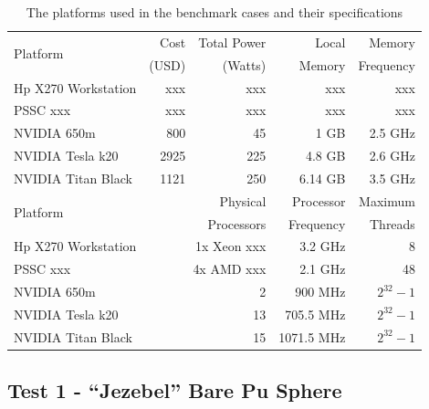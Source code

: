\documentclass[preprint,12pt]{elsarticle}
\begin{document}
\begin{table}[h]
\centering
\caption{The platforms used in the benchmark cases and their specifications}
\label{platform_table}
\small
\begin{tabular}{| l | r | r | r | r |}
\hline
\multirow{2}{*}{Platform} &  Cost   &Total Power  & Local       & Memory     \\
                                       & (USD)  &(Watts) & Memory  & Frequency \\
\hline
Hp X270 Workstation     &    xxx    & xxx &  xxx         &  xxx                      \\
\hline
PSSC xxx                      &    xxx   & xxx &  xxx        &  xxx                    \\
\hline
NVIDIA 650m                &    800   & 45 &  1 GB        &  2.5 GHz                 \\
\hline
NVIDIA Tesla k20         &    2925     & 225 &  4.8  GB      &  2.6 GHz                  \\
\hline
NVIDIA Titan Black       &     1121   & 250 &  6.14 GB        & 3.5 GHz              \\
\hline
\hline
\hline
\multirow{2}{*}{Platform}  &  \multicolumn{2}{r|}{Physical }     & Processor  & Maximum \\
                                        & \multicolumn{2}{r|}{Processors}  & Frequency  & Threads \\
\hline
Hp X270 Workstation      &  \multicolumn{2}{r|}{1x Xeon xxx}  &  3.2 GHz     &  8           \\
\hline
PSSC xxx                      &   \multicolumn{2}{r|}{4x AMD xxx }  &  2.1 GHz     &  48           \\
\hline
NVIDIA 650m                &     \multicolumn{2}{r|}{2}   &   900 MHz    &  $2^{32}-1$           \\
\hline
NVIDIA Tesla k20         &       \multicolumn{2}{r|}{13}   &  705.5 MHz     &  $2^{32}-1$           \\
\hline
NVIDIA Titan Black       &      \multicolumn{2}{r|}{ 15 }  &  1071.5 MHz     & $2^{32}-1$           \\
\hline

\end{tabular}
\end{table}



\subsection{Test 1 - ``Jezebel'' Bare Pu Sphere}
\end{document}
